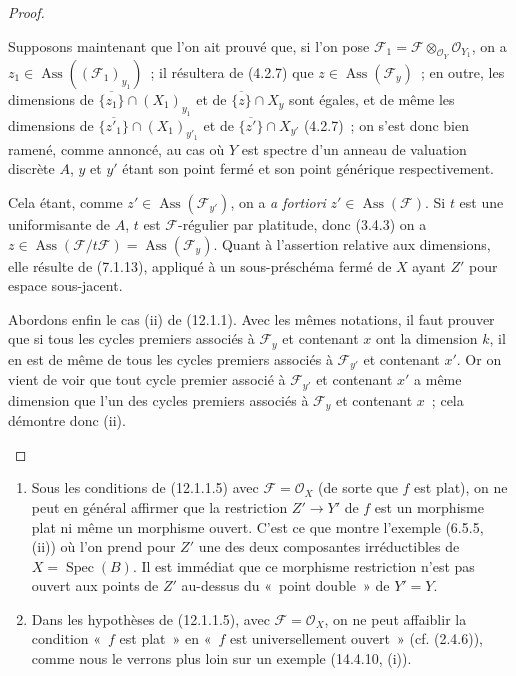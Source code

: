 \begin{proof}
\begin{env}[12.1.1.4]
Supposons maintenant que l'on ait prouvé que, si l'on pose
$\mathcal F_1=\mathcal F\otimes_{\mathcal O_Y}\mathcal O_{Y_1}$, on a
$z_1\in\operatorname{Ass}((\mathcal F_1)_{y_1})$~; il résultera de (4.2.7) que
$z\in\operatorname{Ass}(\mathcal F_y)$~; en outre, les dimensions de
$\overline{\{z_1\}}\cap(X_1)_{y_1}$ et de $\overline{\{z\}}\cap X_y$ sont
égales, et de même les dimensions de
$\overline{\{z'_1\}}\cap(X_1)_{y'_1}$ et de
$\overline{\{z'\}}\cap X_{y'}$ (4.2.7)~; on s'est donc bien ramené, comme
annoncé, au cas où $Y$ est spectre d'un anneau de valuation discrète $A$, $y$
et $y'$ étant son point fermé et son point générique respectivement.

Cela étant, comme $z'\in\operatorname{Ass}(\mathcal F_{y'})$, on a
\emph{a fortiori} $z'\in\operatorname{Ass}(\mathcal F)$. Si $t$ est une
uniformisante de $A$, $t$ est $\mathcal F$-régulier par platitude, donc (3.4.3)
on a $z\in\operatorname{Ass}(\mathcal F/t\mathcal F)
=\operatorname{Ass}(\mathcal F_y)$. Quant à l'assertion relative aux
dimensions, elle résulte de (7.1.13), appliqué à un sous-préschéma fermé de $X$
ayant $Z'$ pour espace sous-jacent.

Abordons enfin le cas (ii) de (12.1.1). Avec les mêmes notations, il faut
prouver que si tous les cycles premiers associés à $\mathcal F_y$ et contenant
$x$ ont la dimension $k$, il en est de même de tous les cycles premiers
associés à $\mathcal F_{y'}$ et contenant $x'$. Or on vient de voir que tout
cycle premier associé à $\mathcal F_{y'}$ et contenant $x'$ a même dimension
que l'un des cycles premiers associés à $\mathcal F_y$ et contenant $x$~; cela
démontre donc (ii).
\end{env}
\end{proof}

\begin{remarks}[12.1.2]
\label{IV.12.1.2-fr}
\begin{enumerate}[label=(\roman*)]
  \item Sous les conditions de (12.1.1.5) avec $\mathcal F=\mathcal O_X$ (de
  sorte que $f$ est plat), on ne peut en général affirmer que la restriction
  $Z'\to Y'$ de $f$ est un morphisme plat ni même un morphisme ouvert. C'est ce
  que montre l'exemple (6.5.5,
  (ii)) où l'on prend pour $Z'$ une des deux composantes irréductibles de
  $X=\operatorname{Spec}(B)$. Il est immédiat que ce morphisme restriction
  n'est pas ouvert aux points de $Z'$ au-dessus du «~point double~» de $Y'=Y$.
  \item Dans les hypothèses de (12.1.1.5), avec
  $\mathcal F=\mathcal O_X$, on ne peut affaiblir la condition «~$f$ est
  plat~» en «~$f$ est universellement ouvert~» (cf. (2.4.6)), comme nous le
  verrons plus loin sur un exemple (14.4.10, (i)).
\end{enumerate}
\end{remarks}

